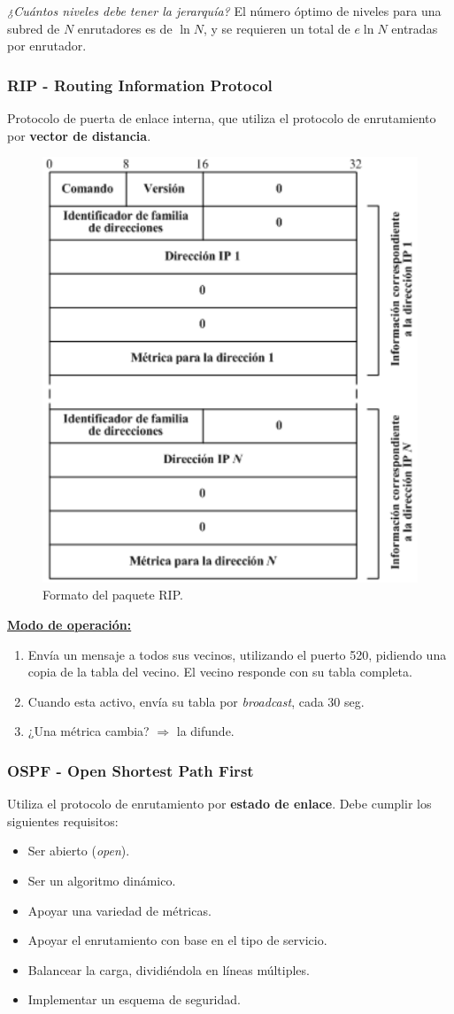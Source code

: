 \documentclass[10pt,a4paper]{article}
\begin{document}
\textit{¿Cuántos niveles debe tener la jerarquía?} El número óptimo de niveles para una subred de $N$ enrutadores es de $\ln N$, y se requieren un total de $e \ln N$ entradas por enrutador.

\subsubsection{RIP - Routing Information Protocol}

Protocolo de puerta de enlace interna, que utiliza el protocolo de enrutamiento por \textbf{vector de distancia}.

\begin{figure}
  \caption{Formato del paquete RIP.}
  \label{fig:rip_protocol}
  \centering
  \hbox{\includegraphics[width=0.5\textwidth-\fboxrule-\fboxrule]{imgs/rip_protocol.png}}
\end{figure}

\underline{\textbf{Modo de operación:}}

\begin{enumerate}
\item Envía un mensaje a todos sus vecinos, utilizando el puerto 520, pidiendo una copia de la tabla del vecino. El vecino responde con su tabla completa.
\item Cuando esta activo, envía su tabla por \textit{broadcast}, cada 30 seg.
\item ¿Una métrica cambia? $\Rightarrow$ la difunde.
\end{enumerate}

\subsubsection{OSPF - Open Shortest Path First}

Utiliza el protocolo de enrutamiento por \textbf{estado de enlace}. Debe cumplir los siguientes requisitos:
\begin{itemize}
\item Ser abierto (\textit{open}).
\item Ser un algoritmo dinámico.
\item Apoyar una variedad de métricas.
\item Apoyar el enrutamiento con base en el tipo de servicio.
\item Balancear la carga, dividiéndola en líneas múltiples.
\item Implementar un esquema de seguridad.
\end{itemize}
\end{document}
